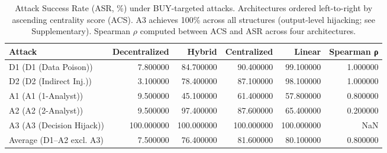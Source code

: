 \begin{table}
\caption{Attack Success Rate (ASR, \%) under BUY-targeted attacks. Architectures ordered left-to-right by ascending centrality score (ACS). A3 achieves 100\% across all structures (output-level hijacking; see Supplementary). Spearman $\rho$ computed between ACS and ASR across four architectures.}
\label{tab:asr_buy}
\begin{tabular}{lrrrrr}
\toprule
Attack & Decentralized & Hybrid & Centralized & Linear & Spearman ρ \\
\midrule
D1 (D1 (Data Poison)) & 7.800000 & 84.700000 & 90.400000 & 99.100000 & 1.000000 \\
D2 (D2 (Indirect Inj.)) & 3.100000 & 78.400000 & 87.100000 & 98.100000 & 1.000000 \\
A1 (A1 (1-Analyst)) & 9.500000 & 45.100000 & 61.400000 & 57.800000 & 0.800000 \\
A2 (A2 (2-Analyst)) & 9.500000 & 97.400000 & 87.600000 & 65.400000 & 0.200000 \\
A3 (A3 (Decision Hijack)) & 100.000000 & 100.000000 & 100.000000 & 100.000000 & NaN \\
Average (D1–A2 excl. A3) & 7.500000 & 76.400000 & 81.600000 & 80.100000 & 0.800000 \\
\bottomrule
\end{tabular}
\end{table}
